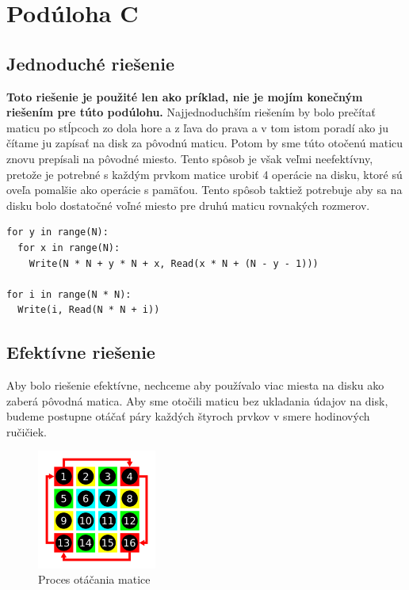 \documentclass{article}
\begin{document}
\section*{Podúloha C}

\subsection*{Jednoduché riešenie}

\textbf{Toto riešenie je použité len ako príklad, nie je mojím konečným riešením pre túto podúlohu.}
\newline
Najjednoduchším riešením by bolo prečítať maticu po stĺpcoch zo dola hore a z ľava do prava a v tom istom poradí ako ju čítame ju zapísať na disk za pôvodnú maticu. Potom by sme túto otočenú maticu znovu prepísali na pôvodné miesto. Tento spôsob je však veľmi neefektívny, pretože je potrebné s každým prvkom matice urobiť 4 operácie na disku, ktoré sú oveľa pomalšie ako operácie s pamäťou. Tento spôsob taktiež potrebuje aby sa na disku bolo dostatočné voľné miesto pre druhú maticu rovnakých rozmerov.

\begin{verbatim}
for y in range(N):
  for x in range(N):
    Write(N * N + y * N + x, Read(x * N + (N - y - 1)))

for i in range(N * N):
  Write(i, Read(N * N + i))
\end{verbatim}

\subsection*{Efektívne riešenie}

Aby bolo riešenie efektívne, nechceme aby používalo viac miesta na disku ako zaberá pôvodná matica.
Aby sme otočili maticu bez ukladania údajov na disk, budeme postupne otáčať páry každých štyroch prvkov v smere hodinových ručičiek.

\begin{figure}[h]
  \centering
  \includegraphics[width=0.35\textwidth]{process}
  \caption{Proces otáčania matice}
\end{figure}
\end{document}

